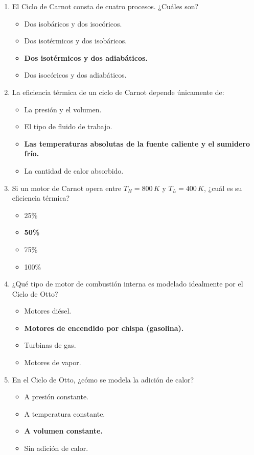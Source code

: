 \documentclass{article}
\begin{document}
\begin{enumerate}[label=\arabic*.]
    \item El Ciclo de Carnot consta de cuatro procesos. ¿Cuáles son?
    \begin{itemize}[label=\alph*)]
        \item Dos isobáricos y dos isocóricos.
        \item Dos isotérmicos y dos isobáricos.
        \item \textbf{Dos isotérmicos y dos adiabáticos.}
        \item Dos isocóricos y dos adiabáticos.
    \end{itemize}

    \item La eficiencia térmica de un ciclo de Carnot depende únicamente de:
    \begin{itemize}[label=\alph*)]
        \item La presión y el volumen.
        \item El tipo de fluido de trabajo.
        \item \textbf{Las temperaturas absolutas de la fuente caliente y el sumidero frío.}
        \item La cantidad de calor absorbido.
    \end{itemize}

    \item Si un motor de Carnot opera entre $T_H = 800 \, K$ y $T_L = 400 \, K$, ¿cuál es su eficiencia térmica?
    \begin{itemize}[label=\alph*)]
        \item 25\%
        \item \textbf{50\%}
        \item 75\%
        \item 100\%
    \end{itemize}

    \item ¿Qué tipo de motor de combustión interna es modelado idealmente por el Ciclo de Otto?
    \begin{itemize}[label=\alph*)]
        \item Motores diésel.
        \item \textbf{Motores de encendido por chispa (gasolina).}
        \item Turbinas de gas.
        \item Motores de vapor.
    \end{itemize}

    \item En el Ciclo de Otto, ¿cómo se modela la adición de calor?
    \begin{itemize}[label=\alph*)]
        \item A presión constante.
        \item A temperatura constante.
        \item \textbf{A volumen constante.}
        \item Sin adición de calor.
    \end{itemize}


\end{enumerate}
\end{document}
